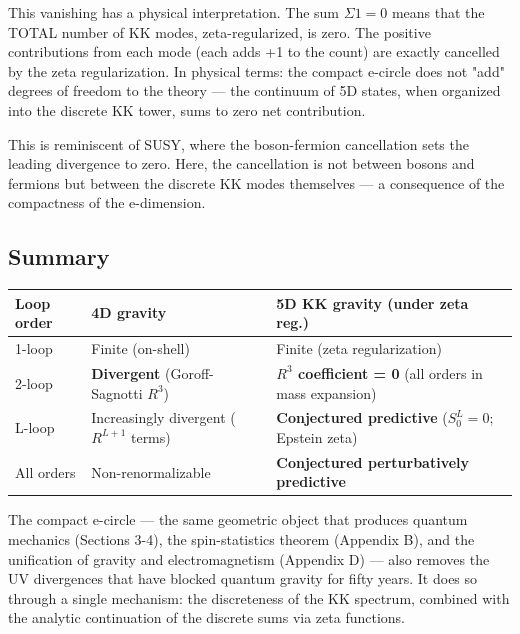 \documentclass[aps,prd,preprint,superscriptaddress,longbibliography,floatfix]{revtex4-2}
\theoremstyle{remark}
\begin{document}
This vanishing has a physical interpretation. The sum $\Sigma 1 = 0$ means that the TOTAL number of KK modes, zeta-regularized, is zero. The positive contributions from each mode (each adds +1 to the count) are exactly cancelled by the zeta regularization. In physical terms: the compact e-circle does not "add" degrees of freedom to the theory --- the continuum of 5D states, when organized into the discrete KK tower, sums to zero net contribution.

This is reminiscent of SUSY, where the boson-fermion cancellation sets the leading divergence to zero. Here, the cancellation is not between bosons and fermions but between the discrete KK modes themselves --- a consequence of the compactness of the e-dimension.



\subsection{Summary}


\begin{table}[H]
\begin{ruledtabular}
\begin{tabular}{p{5.0cm}p{5.0cm}p{5.0cm}}
Loop order & 4D gravity & 5D KK gravity (under zeta reg.) \\
\hline
1-loop & Finite (on-shell) & Finite (zeta regularization) \\
2-loop & \textbf{Divergent} (Goroff-Sagnotti $R^{3}$) & \textbf{$R^{3}$ coefficient = 0} (all orders in mass expansion) \\
L-loop & Increasingly divergent ($R^{L+1}$ terms) & \textbf{Conjectured predictive} ($S_{0}^L = 0$; Epstein zeta) \\
All orders & Non-renormalizable & \textbf{Conjectured perturbatively predictive} \\
\end{tabular}
\end{ruledtabular}
\end{table}

The compact e-circle --- the same geometric object that produces quantum mechanics (Sections 3-4), the spin-statistics theorem (Appendix B), and the unification of gravity and electromagnetism (Appendix D) --- also removes the UV divergences that have blocked quantum gravity for fifty years. It does so through a single mechanism: the discreteness of the KK spectrum, combined with the analytic continuation of the discrete sums via zeta functions.
\end{document}
